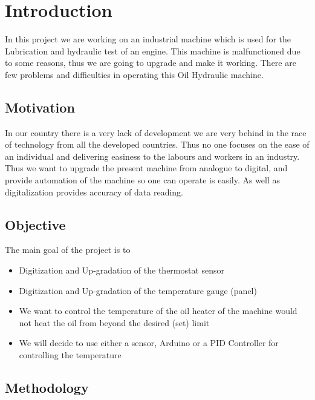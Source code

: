 \documentclass[14pt]{report}
\begin{document}
\tableofcontents\listoffigures\listoftables
\newpage

\chapter{\textbf{Introduction}}

In this project we are working on an industrial machine which is used for the Lubrication and hydraulic
test of an engine. This machine is malfunctioned due to some reasons, thus we are going to upgrade and
make it working. There are few problems and diﬃculties in operating this Oil Hydraulic machine.

\section{\textbf{ Motivation}}

In our country there is a very lack of development we are very behind in the race of technology from
all the developed countries. Thus no one focuses on the ease of an individual and delivering easiness to
the labours and workers in an industry. Thus we want to upgrade the present machine from analogue
to digital, and provide automation of the machine so one can operate is easily. As well as digitalization
provides accuracy of data reading.

\section{\textbf{Objective}}

The main goal of the project is to
\begin{itemize}
  \item Digitization and Up-gradation of the thermostat sensor
  \item Digitization and Up-gradation of the temperature gauge (panel)
  \item We want to control the temperature of the oil heater of the machine would not heat the oil from beyond the desired (set) limit
  \item We will decide to use either a sensor, Arduino or a PID Controller for controlling the temperature
\end{itemize}

\section{\textbf{Methodology}}
    
\end{document}
